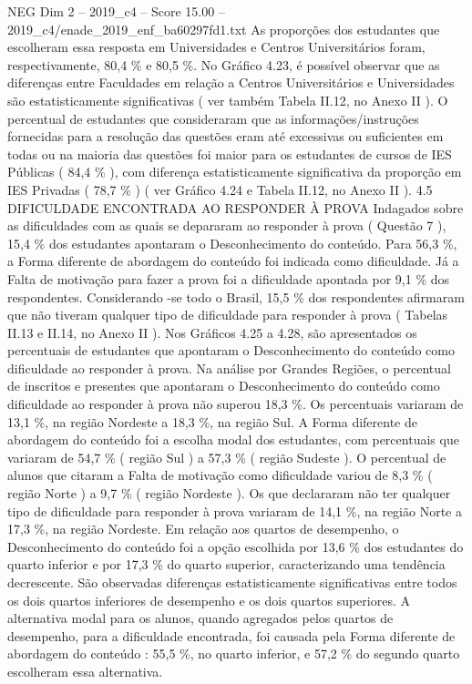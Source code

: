 \begin{textsample}{NEG Dim 2 – 2019\_c4 – Score 15.00 – 2019\_c4/enade\_2019\_enf\_ba60297fd1.txt}
As proporções dos estudantes que escolheram essa resposta em Universidades e Centros Universitários foram, respectivamente, 80,4 \% e 80,5 \%.
No Gráfico 4.23, é possível observar que as diferenças entre Faculdades em relação a Centros Universitários e Universidades são estatisticamente significativas ( ver também Tabela II.12, no Anexo II ).
O percentual de estudantes que consideraram que as informações/instruções fornecidas para a resolução das questões eram até excessivas ou suficientes em todas ou na maioria das questões foi maior para os estudantes de cursos de IES Públicas ( 84,4 \% ), com diferença estatisticamente significativa da proporção em IES Privadas ( 78,7 \% ) ( ver Gráfico 4.24 e Tabela II.12, no Anexo II ). 4.5 DIFICULDADE ENCONTRADA AO RESPONDER À PROVA Indagados sobre as dificuldades com as quais se depararam ao responder à prova ( Questão 7 ), 15,4 \% dos estudantes apontaram o Desconhecimento do conteúdo.
Para 56,3 \%, a Forma diferente de abordagem do conteúdo foi indicada como dificuldade.
Já a Falta de motivação para fazer a prova foi a dificuldade apontada por 9,1 \% dos respondentes.
Considerando -se todo o Brasil, 15,5 \% dos respondentes afirmaram que não tiveram qualquer tipo de dificuldade para responder à prova ( Tabelas II.13 e II.14, no Anexo II ).
Nos Gráficos 4.25 a 4.28, são apresentados os percentuais de estudantes que apontaram o Desconhecimento do conteúdo como dificuldade ao responder à prova.
Na análise por Grandes Regiões, o percentual de inscritos e presentes que apontaram o Desconhecimento do conteúdo como dificuldade ao responder à prova não superou 18,3 \%.
Os percentuais variaram de 13,1 \%, na região Nordeste a 18,3 \%, na região Sul.
A Forma diferente de abordagem do conteúdo foi a escolha modal dos estudantes, com percentuais que variaram de 54,7 \% ( região Sul ) a 57,3 \% ( região Sudeste ).
O percentual de alunos que citaram a Falta de motivação como dificuldade variou de 8,3 \% ( região Norte ) a 9,7 \% ( região Nordeste ).
Os que declararam não ter qualquer tipo de dificuldade para responder à prova variaram de 14,1 \%, na região Norte a 17,3 \%, na região Nordeste.
Em relação aos quartos de desempenho, o Desconhecimento do conteúdo foi a opção escolhida por 13,6 \% dos estudantes do quarto inferior e por 17,3 \% do quarto superior, caracterizando uma tendência decrescente.
São observadas diferenças estatisticamente significativas entre todos os dois quartos inferiores de desempenho e os dois quartos superiores.
A alternativa modal para os alunos, quando agregados pelos quartos de desempenho, para a dificuldade encontrada, foi causada pela Forma diferente de abordagem do conteúdo : 55,5 \%, no quarto inferior, e 57,2 \% do segundo quarto escolheram essa alternativa.

\end{textsample}
